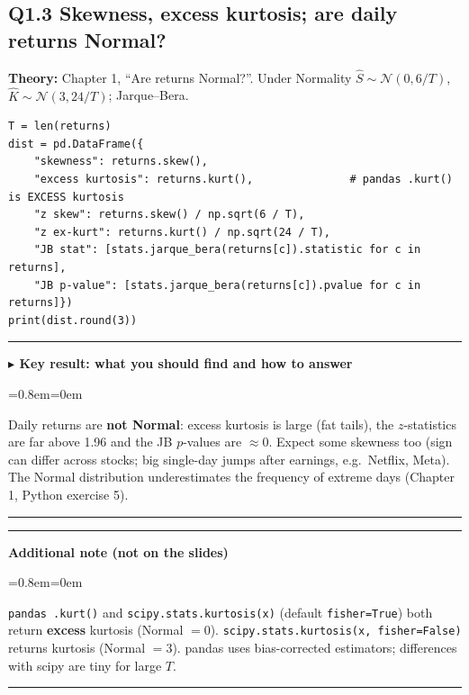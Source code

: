 \documentclass[11pt,a4paper]{report}
\newenvironment{notebox}[1]
  {\par\medskip\Needspace{6\baselineskip}\noindent\rule{\linewidth}{0.4pt}\par\nopagebreak
   \noindent\textbf{#1}\par\nopagebreak
   \begin{list}{}{\leftmargin=0.8em\rightmargin=0em\topsep=2pt}\item[]}
  {\end{list}\nopagebreak\noindent\rule{\linewidth}{0.4pt}\par\medskip}
\newenvironment{keybox}[1][]{\begin{notebox}{$\blacktriangleright$ Key result#1}}{\end{notebox}}
\newenvironment{addnote}{\begin{notebox}{Additional note (not on the slides)}}{\end{notebox}}
\begin{document}
\subsection*{Q1.3 Skewness, excess kurtosis; are daily returns Normal?}
\textbf{Theory:} Chapter 1, ``Are returns Normal?''. Under Normality
$\hat S\sim\mathcal N(0,6/T)$, $\hat K\sim\mathcal N(3,24/T)$; Jarque--Bera.
\begin{lstlisting}
T = len(returns)
dist = pd.DataFrame({
    "skewness": returns.skew(),
    "excess kurtosis": returns.kurt(),               # pandas .kurt() is EXCESS kurtosis
    "z skew": returns.skew() / np.sqrt(6 / T),
    "z ex-kurt": returns.kurt() / np.sqrt(24 / T),
    "JB stat": [stats.jarque_bera(returns[c]).statistic for c in returns],
    "JB p-value": [stats.jarque_bera(returns[c]).pvalue for c in returns]})
print(dist.round(3))
\end{lstlisting}
\begin{keybox}[: what you should find and how to answer]
Daily returns are \textbf{not Normal}: excess kurtosis is large (fat tails), the
$z$-statistics are far above 1.96 and the JB $p$-values are $\approx0$. Expect
some skewness too (sign can differ across stocks; big single-day jumps after
earnings, e.g.\ Netflix, Meta). The Normal distribution underestimates the
frequency of extreme days (Chapter 1, Python exercise 5).
\end{keybox}
\begin{addnote}
\texttt{pandas .kurt()} and \texttt{scipy.stats.kurtosis(x)} (default
\texttt{fisher=True}) both return \textbf{excess} kurtosis (Normal $=0$).
\texttt{scipy.stats.kurtosis(x, fisher=False)} returns kurtosis (Normal $=3$).
pandas uses bias-corrected estimators; differences with scipy are tiny for large $T$.
\end{addnote}
\end{document}
